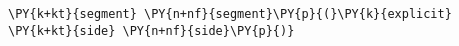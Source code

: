 \begin{Verbatim}[commandchars=\\\{\}]
    \PY{k+kt}{segment} \PY{n+nf}{segment}\PY{p}{(}\PY{k}{explicit} \PY{k+kt}{side} \PY{n+nf}{side}\PY{p}{)}
\end{Verbatim}
